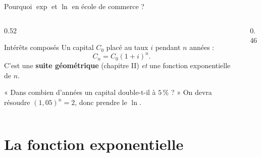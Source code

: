 \documentclass[10pt,aspectratio=169]{beamer}
\numberwithin{dummy}{section}
\begin{document}
\begin{frame}{Pourquoi $\exp$ et $\ln$ en école de commerce ?}
\begin{columns}[T]
\begin{column}{0.52\textwidth}
\begin{block}{Intérêts composés}
Un capital $C_0$ placé au taux $i$ pendant $n$ années :
\[
C_n=C_0(1+i)^n.
\]
C'est une \textbf{suite géométrique} (chapitre II)
\emph{et} une fonction exponentielle de $n$.
\end{block}
\begin{boxgestion}
« Dans combien d'années un capital double-t-il à $5\,\%$ ? »
On devra résoudre $(1{,}05)^n=2$, donc prendre le $\ln$.
\end{boxgestion}
\end{column}
\begin{column}{0.46\textwidth}
\centering
{}
\end{column}
\end{columns}
\end{frame}

\section{La fonction exponentielle}
\end{document}
